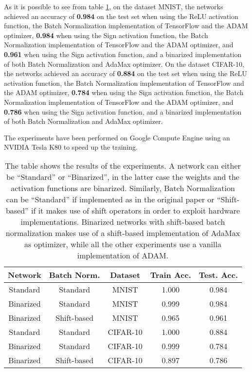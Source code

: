 \documentclass[a4paper]{article}
\numberwithin{equation}{section} %
\numberwithin{figure}{section} %
\numberwithin{table}{section} %
\theoremstyle{definition}
\begin{document}
As it is possible to see from table \ref{table:experiments},
on the dataset MNIST, the networks achieved an accuracy of \textbf{0.984} on the
test set when
using the ReLU activation function, the Batch Normalization implementation
of TensorFlow and the ADAM optimizer, \textbf{0.984} when using the Sign 
activation function, the Batch Normalization implementation of TensorFlow
and the ADAM optimizer, and \textbf{0.961} when using the Sign
activation function,
and a binarized implementation of both Batch Normalization and AdaMax
optimizer. On the dataset CIFAR-10, the networks achieved an accuracy
of \textbf{0.884} on the test set when
using the ReLU activation function, the Batch Normalization implementation
of TensorFlow and the ADAM optimizer, \textbf{0.784} when using the Sign 
activation function, the Batch Normalization implementation of TensorFlow
and the ADAM optimizer, and \textbf{0.786} when using the Sign activation
function,
and a binarized implementation of both Batch Normalization and AdaMax
optimizer.

The experiments have been performed on Google Compute Engine
using an NVIDIA Tesla K80 to speed up the training.

\begin{table}
	\centering
	\begin{tabular}{*{5}{c}}
		Network & Batch Norm. & Dataset & Train Acc. & Test. Acc. \\
		\hline
		Standard & Standard & MNIST & 1.000 & 0.984 \\
		Binarized & Standard & MNIST & 0.999 & 0.984 \\
		Binarized & Shift-based & MNIST & 0.965 & 0.961 \\
		\hline
		Standard & Standard & CIFAR-10 & 1.000 & 0.884 \\
		Binarized & Standard & CIFAR-10 & 0.999 & 0.784 \\
		Binarized & Shift-based & CIFAR-10 & 0.897 & 0.786 \\
	\end{tabular}
	\caption{
	    The table shows the results of the experiments.
	    A network can either be ``Standard'' or ``Binarized'',
	    in the latter case the weights and the activation 
	    functions are binarized. Similarly, Batch Normalization
	    can be ``Standard'' if implemented as in the original
	    paper\cite{batchnormalization} or ``Shift-based'' if
	    it makes use of shift operators in order to exploit
	    hardware implementations. Binarized networks with
	    shift-based batch normalization makes use of a
	    shift-based implementation of AdaMax as optimizer,
	    while all the other experiments use a vanilla
	    implementation of ADAM.}
    \label{table:experiments}
\end{table}
\end{document}
